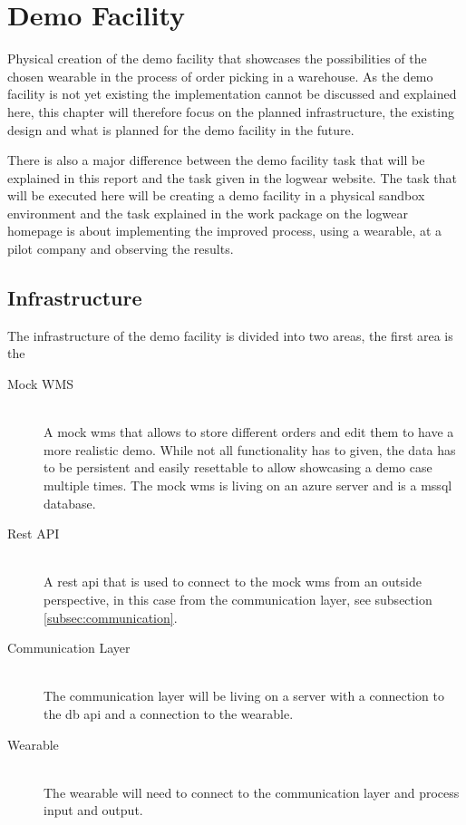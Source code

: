\chapter{Demo Facility}\label{cha:demoFacility}
Physical creation of the demo facility that showcases the possibilities of the chosen wearable in the process of order picking in a warehouse. As the demo facility is not yet existing the implementation cannot be discussed and explained here, this chapter will therefore focus on the planned infrastructure, the existing design and what is planned for the demo facility in the future. 

There is also a major difference between the demo facility task that will be explained in this report and the task given in the logwear website. \citep{website:logwear} The task that will be executed here will be creating a demo facility in a physical \gls{sandbox} environment and the task explained in the work package on the logwear homepage is about implementing the improved process, using a wearable, at a pilot company and observing the results.

\section{Infrastructure}
The infrastructure of the demo facility is divided into two areas, the first area is the 
\begin{description}
	\item[Mock WMS] \hfill \\
		A mock \gls{wms} that allows to store different orders and edit them to have a more realistic demo. While not all functionality has to given, the data has to be persistent and easily resettable to allow showcasing a demo case multiple times. The mock \gls{wms} is living on an azure server and is a \gls{mssql} database.
	\item[Rest API] \hfill \\
		A \gls{rest} \gls{api} that is used to connect to the mock \gls{wms} from an outside perspective, in this case from the communication layer, see subsection \ref{subsec:communication}.
	\item[Communication Layer] \hfill \\
		The communication layer will be living on a server with a connection to the \gls{db} \gls{api} and a connection to the wearable.
	\item[Wearable] \hfill \\
		The wearable will need to connect to the communication layer and process input and output.
\end{description}

